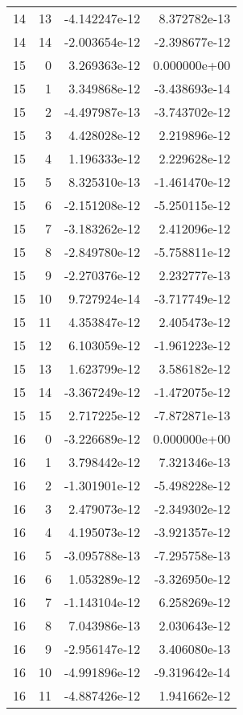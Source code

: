 \begin{tabular}{rrrr}
  14 &   13 & -4.142247e-12 &  8.372782e-13 \\
  14 &   14 & -2.003654e-12 & -2.398677e-12 \\
  15 &    0 &  3.269363e-12 &  0.000000e+00 \\
  15 &    1 &  3.349868e-12 & -3.438693e-14 \\
  15 &    2 & -4.497987e-13 & -3.743702e-12 \\
  15 &    3 &  4.428028e-12 &  2.219896e-12 \\
  15 &    4 &  1.196333e-12 &  2.229628e-12 \\
  15 &    5 &  8.325310e-13 & -1.461470e-12 \\
  15 &    6 & -2.151208e-12 & -5.250115e-12 \\
  15 &    7 & -3.183262e-12 &  2.412096e-12 \\
  15 &    8 & -2.849780e-12 & -5.758811e-12 \\
  15 &    9 & -2.270376e-12 &  2.232777e-13 \\
  15 &   10 &  9.727924e-14 & -3.717749e-12 \\
  15 &   11 &  4.353847e-12 &  2.405473e-12 \\
  15 &   12 &  6.103059e-12 & -1.961223e-12 \\
  15 &   13 &  1.623799e-12 &  3.586182e-12 \\
  15 &   14 & -3.367249e-12 & -1.472075e-12 \\
  15 &   15 &  2.717225e-12 & -7.872871e-13 \\
  16 &    0 & -3.226689e-12 &  0.000000e+00 \\
  16 &    1 &  3.798442e-12 &  7.321346e-13 \\
  16 &    2 & -1.301901e-12 & -5.498228e-12 \\
  16 &    3 &  2.479073e-12 & -2.349302e-12 \\
  16 &    4 &  4.195073e-12 & -3.921357e-12 \\
  16 &    5 & -3.095788e-13 & -7.295758e-13 \\
  16 &    6 &  1.053289e-12 & -3.326950e-12 \\
  16 &    7 & -1.143104e-12 &  6.258269e-12 \\
  16 &    8 &  7.043986e-13 &  2.030643e-12 \\
  16 &    9 & -2.956147e-12 &  3.406080e-13 \\
  16 &   10 & -4.991896e-12 & -9.319642e-14 \\
  16 &   11 & -4.887426e-12 &  1.941662e-12 \\

\end{tabular}
